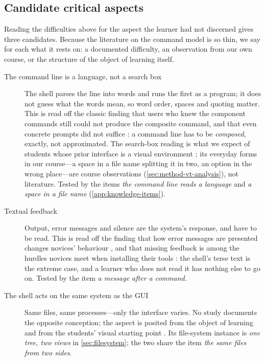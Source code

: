 \subsection{Candidate critical aspects}
\label{sec:shell-aspects}

Reading the difficulties above for the aspect the learner had not
discerned gives three candidates.
Because the literature on the command model is so thin, we say for each
what it rests on: a documented difficulty, an observation from our own
course, or the structure of the object of learning itself.

\begin{description}
  \item[The command line is a language, not a search box]
    The shell parses the line into words and runs the first as a program;
    it does not guess what the words mean, so word order, spaces and
    quoting matter.
    This is read off the classic finding that users who knew the
    component commands still could not produce the composite command,
    and that even concrete prompts did not suffice
    \autocite{Doane1992UnixPrompts}: a command line has to be
    \emph{composed}, exactly, not approximated.
    The search-box reading is what we expect of students whose prior
    interface is a visual environment \autocite{Dillon2012MentalModels};
    its everyday forms in our course---a space in a file name splitting
    it in two, an option in the wrong place---are course observations
    (\cref{sec:method-vt-analysis}), not literature.
    Tested by the items \emph{the command line reads a language} and
    \emph{a space in a file name} (\cref{app:knowledge-items}).
  \item[Textual feedback]
    Output, error messages and silence are the system's response, and
    have to be read.
    This is read off the finding that how error messages are presented
    changes novices' behaviour \autocite{Karvelas2020ErrorMessages}, and
    that missing feedback is among the hurdles novices meet when
    installing their tools \autocite{Salerno2026ToolInstallation}: the
    shell's terse text is the extreme case, and a learner who does not
    read it has nothing else to go on.
    Tested by the item \emph{a message after a command}.
  \item[The shell acts on the same system as the GUI]
    Same files, same processes---only the interface varies.
    No study documents the opposite conception; the aspect is posited
    from the object of learning and from the students' visual starting
    point \autocite{Dillon2012MentalModels}.
    Its file-system instance is \emph{one tree, two views} in
    \cref{sec:filesystem}; the two share the item \emph{the same files
    from two sides}.
\end{description}

